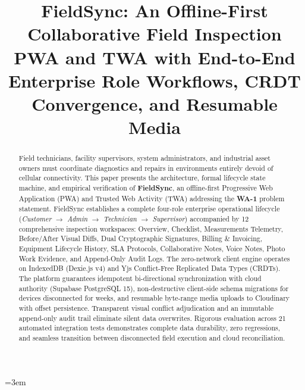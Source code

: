 \documentclass[conference]{IEEEtran}
\begin{document}
\hfuzz=10pt
\sloppy
\emergencystretch=3em

\title{\LARGE\bfseries FieldSync: An Offline-First Collaborative Field Inspection PWA and TWA with End-to-End Enterprise Role Workflows, CRDT Convergence, and Resumable Media}

\author{
}

\maketitle

\begin{abstract}
Field technicians, facility supervisors, system administrators, and industrial asset owners must coordinate diagnostics and repairs in environments entirely devoid of cellular connectivity. This paper presents the architecture, formal lifecycle state machine, and empirical verification of \textbf{FieldSync}, an offline-first Progressive Web Application (PWA) and Trusted Web Activity (TWA) addressing the \textbf{WA-1} problem statement. FieldSync establishes a complete four-role enterprise operational lifecycle (\textit{Customer} $\rightarrow$ \textit{Admin} $\rightarrow$ \textit{Technician} $\rightarrow$ \textit{Supervisor}) accompanied by 12 comprehensive inspection workspaces: Overview, Checklist, Measurements Telemetry, Before/After Visual Diffs, Dual Cryptographic Signatures, Billing \& Invoicing, Equipment Lifecycle History, SLA Protocols, Collaborative Notes, Voice Notes, Photo Work Evidence, and Append-Only Audit Logs. The zero-network client engine operates on IndexedDB (Dexie.js v4) and Yjs Conflict-Free Replicated Data Types (CRDTs). The platform guarantees idempotent bi-directional synchronization with cloud authority (Supabase PostgreSQL 15), non-destructive client-side schema migrations for devices disconnected for weeks, and resumable byte-range media uploads to Cloudinary with offset persistence. Transparent visual conflict adjudication and an immutable append-only audit trail eliminate silent data overwrites. Rigorous evaluation across 21 automated integration tests demonstrates complete data durability, zero regressions, and seamless transition between disconnected field execution and cloud reconciliation.
\end{abstract}
\end{document}
